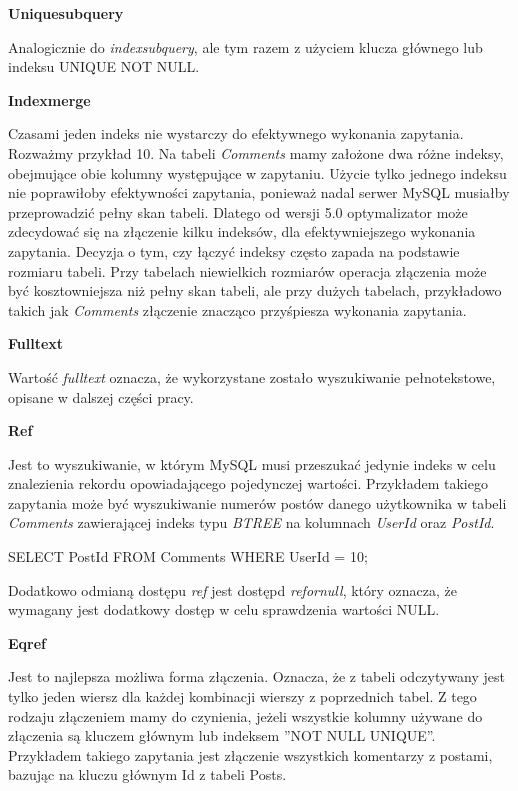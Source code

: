 \centerline{\textbf{Unique\textunderscore subquery}}
\newline

Analogicznie do \textit{index\textunderscore subquery}, ale tym razem z użyciem klucza głównego lub indeksu UNIQUE NOT NULL.

\centerline{\textbf{Index\textunderscore merge}}
\newline

Czasami jeden indeks nie wystarczy do efektywnego wykonania zapytania. Rozważmy przykład 10. Na tabeli \textit{Comments} mamy założone dwa różne indeksy, obejmujące obie kolumny występujące w zapytaniu. Użycie tylko jednego indeksu nie poprawiłoby efektywności zapytania, ponieważ nadal serwer MySQL musiałby przeprowadzić pełny skan tabeli. Dlatego od wersji 5.0 optymalizator może zdecydować się na złączenie kilku indeksów, dla efektywniejszego wykonania zapytania. Decyzja o tym, czy łączyć indeksy często zapada na podstawie rozmiaru tabeli. Przy tabelach niewielkich rozmiarów operacja złączenia może być kosztowniejsza niż pełny skan tabeli, ale przy dużych tabelach, przykładowo takich jak \textit{Comments} złączenie znacząco przyśpiesza wykonania zapytania. 

\centerline{\textbf{Fulltext}}
\newline

Wartość \textit{fulltext} oznacza, że wykorzystane zostało wyszukiwanie pełnotekstowe, opisane w dalszej części pracy.

\centerline{\textbf{Ref}}
\newline

Jest to wyszukiwanie, w którym MySQL musi przeszukać jedynie indeks w celu znalezienia rekordu opowiadającego pojedynczej wartości.
Przykładem takiego zapytania może być wyszukiwanie numerów postów danego użytkownika w tabeli \textit{Comments} zawierającej indeks typu \textit{BTREE} na kolumnach \textit{UserId} oraz \textit{PostId}.

\begin{spverbatim}
	SELECT PostId FROM Comments WHERE UserId = 10;
\end{spverbatim}
Dodatkowo odmianą dostępu \textit{ref} jest dostępd \textit{ref\textunderscore or\textunderscore null}, który oznacza, że wymagany jest dodatkowy dostęp w celu sprawdzenia wartości NULL.


\centerline{\textbf{Eq\textunderscore ref}}
\newline

Jest to najlepsza możliwa forma złączenia. Oznacza, że z tabeli odczytywany jest tylko jeden wiersz dla każdej kombinacji wierszy z poprzednich tabel. Z tego rodzaju złączeniem mamy do czynienia, jeżeli wszystkie kolumny używane do złączenia są kluczem głównym lub indeksem ''NOT NULL UNIQUE''. Przykładem takiego zapytania jest złączenie wszystkich komentarzy z postami, bazując na kluczu głównym Id z tabeli Posts. 

